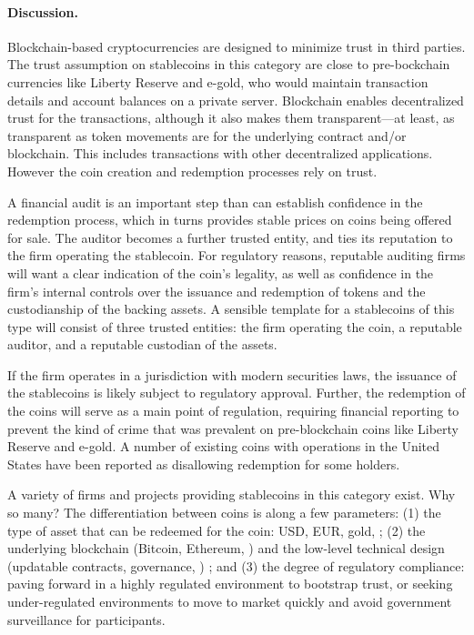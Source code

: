 \paragraph{Discussion.} Blockchain-based cryptocurrencies are designed to minimize trust in third parties. The trust assumption on stablecoins in this category are close to pre-bockchain currencies like Liberty Reserve and e-gold, who would maintain transaction details and account balances on a private server. Blockchain enables decentralized trust for the transactions, although it also makes them transparent---at least, as transparent as token movements are for the underlying contract and/or blockchain. This includes transactions with other decentralized applications. However the coin creation and redemption processes rely on trust.

A financial audit is an important step than can establish confidence in the redemption process, which in turns provides stable prices on coins being offered for sale. The auditor becomes a further trusted entity, and ties its reputation to the firm operating the stablecoin. For regulatory reasons, reputable auditing firms will want a clear indication of the coin's legality, as well as confidence in the firm's internal controls over the issuance and redemption of tokens and the custodianship of the backing assets. A sensible template for a stablecoins of this type will consist of three trusted entities: the firm operating the coin, a reputable auditor, and a reputable custodian of the assets. 

If the firm operates in a jurisdiction with modern securities laws, the issuance of the stablecoins is likely subject to regulatory approval. Further, the redemption of the coins will serve as a main point of regulation, requiring financial reporting to prevent the kind of crime that was prevalent on pre-blockchain coins like Liberty Reserve and e-gold. A number of existing coins with operations in the United States have been reported as disallowing redemption for some holders.


A variety of firms and projects providing stablecoins in this category exist. Why so many? The differentiation between coins is along a few parameters: (1) the type of asset that can be redeemed for the coin: USD, EUR, gold, \etc; (2) the underlying blockchain (\eg Bitcoin, Ethereum, \etc) and the low-level technical design (updatable contracts, governance, \etc) ; and (3) the degree of regulatory compliance: paving forward in a highly regulated environment to bootstrap trust, or seeking under-regulated environments to move to market quickly and avoid government surveillance for participants.

